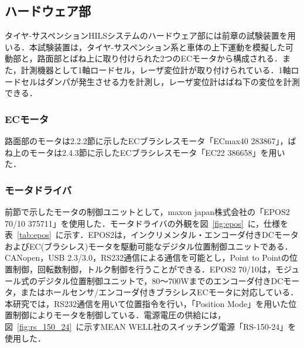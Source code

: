 \documentclass[a4paper,12pt]{article_vdlab_sotsuron}
\begin{document}
\vspace*{10mm}
\subsection{ハードウェア部}
タイヤ-サスペンションHILSシステムのハードウェア部には前章の試験装置を用いる．本試験装置は，タイヤ-サスペンション系と車体の上下運動を模擬した可動部と，路面部とばね上に取り付けられた2つのECモータから構成される．また，計測機器として1軸ロードセル，レーザ変位計が取り付けられている．1軸ロードセルはダンパが発生させる力を計測し，レーザ変位計はばね下の変位を計測できる．

\newpage
\subsubsection{ECモータ}
路面部のモータは2.2.2節に示したECブラシレスモータ「ECmax40 283867」，ばね上のモータは2.4.3節に示したECブラシレスモータ「EC22 386658」を用いた．

\vspace*{10mm}
\subsubsection{モータドライバ}
前節で示したモータの制御ユニットとして，maxon japan株式会社の「EPOS2 70/10 375711」を使用した．モータドライバの外観を図~\ref{fig:epos}~に，仕様を表~\ref{tab:epos}~に示す．EPOS2は，インクリメンタル・エンコーダ付きDCモータおよびEC(ブラシレス)モータを駆動可能なデジタル位置制御ユニットである．CANopen，USB 2.3/3.0，RS232通信による通信を可能とし，Point to Pointの位置制御，回転数制御，トルク制御を行うことができる．EPOS2 70/10は，モジュール式のデジタル位置制御ユニットで，80～700Wまでのエンコーダ付きDCモータ，またはホールセンサ/エンコーダ付きブラシレスECモータに対応している．本研究では，RS232通信を用いて位置指令を行い，「Position Mode」を用いた位置制御によりモータを制御している．電源電圧の供給には，図~\ref{fig:rs_150_24}~に示すMEAN WELL社のスイッチング電源「RS-150-24」を使用した．
\end{document}
